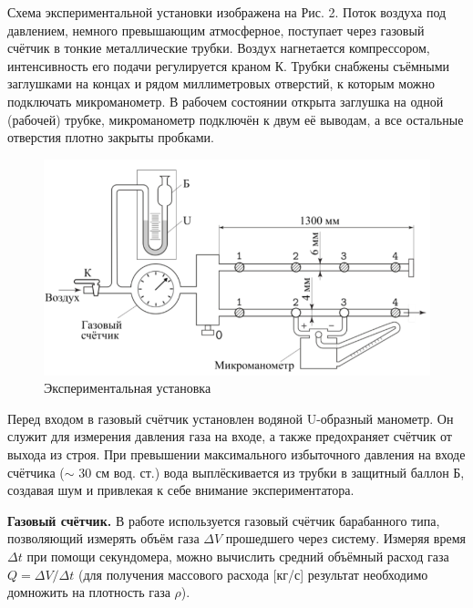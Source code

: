 \documentclass[a4paper, 10pt, twocolumn]{article}
\begin{document}
    Схема экспериментальной установки изображена на Рис. 2. Поток воздуха
    под давлением, немного превышающим атмосферное, поступает через газовый счётчик в тонкие металлические трубки. Воздух нагнетается компрессором, интенсивность его подачи регулируется краном К. Трубки снабжены
    съёмными заглушками на концах и рядом миллиметровых отверстий, к которым можно подключать микроманометр. В рабочем состоянии открыта заглушка на одной (рабочей) трубке, микроманометр подключён к двум её выводам, а все остальные отверстия плотно закрыты пробками.

    \begin{figure}[H]
        \includegraphics[width=1\linewidth]{images/installation.png}
        \begin{center}
            \caption{Экспериментальная установка}
        \end{center}
    \end{figure}

    Перед входом в газовый счётчик установлен водяной U-образный манометр. Он служит для измерения давления газа на входе, а также предохраняет
    счётчик от выхода из строя. При превышении максимального избыточного
    давления на входе счётчика ($\sim$ 30 см вод. ст.) вода выплёскивается из трубки
    в защитный баллон Б, создавая шум и привлекая к себе внимание экспериментатора.


    \textbf{Газовый счётчик.} В работе используется газовый счётчик барабанного
    типа, позволяющий измерять объём газа $\Delta V$ прошедшего через систему. Измеряя время $\Delta t$ при помощи секундомера, можно вычислить средний объёмный расход газа $Q = \Delta V/ \Delta t$ (для получения массового расхода [кг/с] результат
    необходимо домножить на плотность газа $\rho$).
\end{document}
